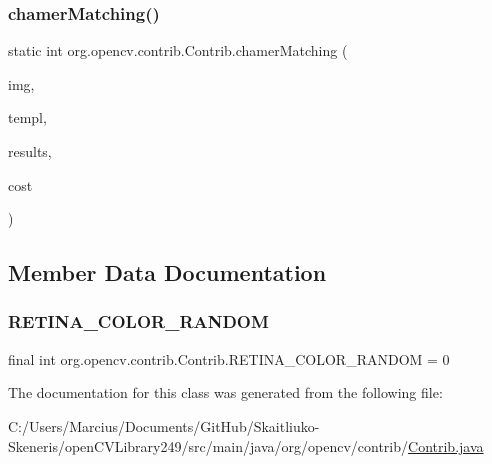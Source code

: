 \subsubsection{\texorpdfstring{chamer\+Matching()}{chamerMatching()}\hspace{0.1cm}{\footnotesize\ttfamily [2/2]}}
{\footnotesize\ttfamily static int org.\+opencv.\+contrib.\+Contrib.\+chamer\+Matching (\begin{DoxyParamCaption}\item[{\mbox{\hyperlink{classorg_1_1opencv_1_1core_1_1_mat}{Mat}}}]{img,  }\item[{\mbox{\hyperlink{classorg_1_1opencv_1_1core_1_1_mat}{Mat}}}]{templ,  }\item[{List$<$ \mbox{\hyperlink{classorg_1_1opencv_1_1core_1_1_mat_of_point}{Mat\+Of\+Point}} $>$}]{results,  }\item[{\mbox{\hyperlink{classorg_1_1opencv_1_1core_1_1_mat_of_float}{Mat\+Of\+Float}}}]{cost }\end{DoxyParamCaption})\hspace{0.3cm}{\ttfamily [static]}}



\subsection{Member Data Documentation}
\mbox{\label{classorg_1_1opencv_1_1contrib_1_1_contrib_aa29c053a83a2ef41e1d07a0eba03bb91}} 
\subsubsection{\texorpdfstring{R\+E\+T\+I\+N\+A\+\_\+\+C\+O\+L\+O\+R\+\_\+\+R\+A\+N\+D\+OM}{RETINA\_COLOR\_RANDOM}}
{\footnotesize\ttfamily final int org.\+opencv.\+contrib.\+Contrib.\+R\+E\+T\+I\+N\+A\+\_\+\+C\+O\+L\+O\+R\+\_\+\+R\+A\+N\+D\+OM = 0\hspace{0.3cm}{\ttfamily [static]}}



The documentation for this class was generated from the following file\+:\begin{DoxyCompactItemize}
\item 
C\+:/\+Users/\+Marcius/\+Documents/\+Git\+Hub/\+Skaitliuko-\/\+Skeneris/open\+C\+V\+Library249/src/main/java/org/opencv/contrib/\mbox{\hyperlink{_contrib_8java}{Contrib.\+java}}\end{DoxyCompactItemize}
